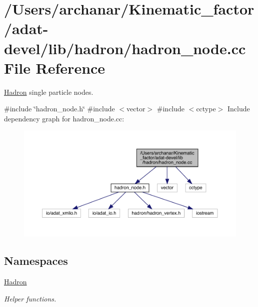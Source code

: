 \hypertarget{adat-devel_2lib_2hadron_2hadron__node_8cc}{}\section{/\+Users/archanar/\+Kinematic\+\_\+factor/adat-\/devel/lib/hadron/hadron\+\_\+node.cc File Reference}
\label{adat-devel_2lib_2hadron_2hadron__node_8cc}


\mbox{\hyperlink{namespaceHadron}{Hadron}} single particle nodes.  


{\ttfamily \#include \char`\"{}hadron\+\_\+node.\+h\char`\"{}}\newline
{\ttfamily \#include $<$vector$>$}\newline
{\ttfamily \#include $<$cctype$>$}\newline
Include dependency graph for hadron\+\_\+node.\+cc\+:
\nopagebreak
\begin{figure}[H]
\begin{center}
\leavevmode
\includegraphics[width=350pt]{d2/d2d/adat-devel_2lib_2hadron_2hadron__node_8cc__incl}
\end{center}
\end{figure}
\subsection*{Namespaces}
\begin{DoxyCompactItemize}
\item 
 \mbox{\hyperlink{namespaceHadron}{Hadron}}
\begin{DoxyCompactList}\small\item\em Helper functions. \end{DoxyCompactList}\end{DoxyCompactItemize}
